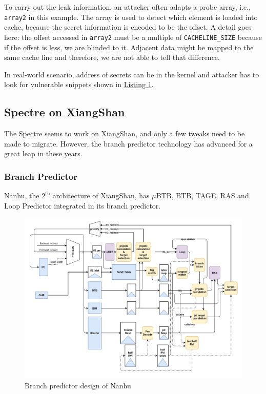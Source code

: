 To carry out the leak information, an attacker often adapts a probe array, i.e., \verb|array2| in this example. The array is used to detect which element is loaded into cache, because the secret information is encoded to be the offset. A detail goes here: the offset accessed in \verb|array2| must be a multiple of \verb|CACHELINE_SIZE| because if the offset is less, we are blinded to it. Adjacent data might be mapped to the same cache line and therefore, we are not able to tell that difference.

In real-world scenario, address of secrets can be in the kernel and attacker has to look for vulnerable snippets shown in \href{listing:spectre_vulnerable}{Listing 1}.

\subsection{Spectre on XiangShan}

The Spectre seems to work on XiangShan, and only a few tweaks need to be made to migrate. However, the branch predictor technology has advanced
for a great leap in these years.

\subsubsection{Branch Predictor}
Nanhu, the $2^{\text{th}}$ architecture of XiangShan, has $\mu$BTB, BTB, TAGE, RAS and Loop Predictor integrated in its branch predictor.

\begin{figure}[!htbp]
    \centering
    \includegraphics[width=0.99\linewidth]{Figure/xs-branch-predictor.png}
    \caption{Branch predictor design of Nanhu}
    \label{fig:xs-branch-pred}
\end{figure}

